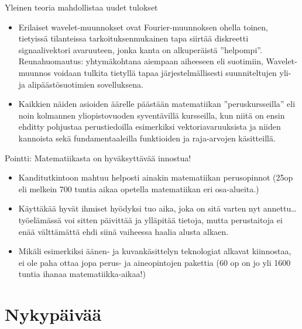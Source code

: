 \documentclass[pdf,handout,10pt]{beamer}
\begin{document}
\begin{frame}{Yleinen teoria mahdollistaa uudet tulokset}
\begin{itemize}
\item
  Erilaiset wavelet-muunnokset \cite{daubechies1990wavelet} ovat
  Fourier-muunnoksen ohella toinen, tietyissä tilanteissa
  tarkoituksenmukainen tapa siirtää diskreetti signaalivektori
  avaruuteen, jonka kanta on alkuperäistä
  ''helpompi''. Reunahuomautus: yhtymäkohtana aiempaan aiheeseen eli
  suotimiin, Wavelet-muunnos voidaan tulkita tietyllä tapaa
  järjestelmällisesti suunniteltujen yli- ja alipäästösuotimien
  sovelluksena.
\item
  Kaikkien näiden asioiden äärelle päästään matematiikan
  ''peruskursseilla'' eli noin kolmannen yliopistovuoden syventävillä
  kursseilla, kun niitä on ensin ehditty pohjustaa perustiedoilla
  esimerkiksi vektoriavaruuksista ja niiden kannoista sekä
  fundamentaaleilla funktioiden ja raja-arvojen käsitteillä.
\end{itemize}
\end{frame}

\begin{frame}{Pointti: Matematiikasta on hyväksyttävää innostua!}

\begin{itemize}
\item
  Kanditutkintoon mahtuu helposti ainakin matematiikan perusopinnot
  (25op eli melkein 700 tuntia aikaa opetella matematiikan eri
  osa-alueita.)
\item
  Käyttäkää hyvät ihmiset hyödyksi tuo aika, joka on sitä varten nyt
  annettu\ldots työelämässä voi sitten päivittää ja ylläpitää tietoja,
  mutta perustaitoja ei enää välttämättä ehdi siinä vaiheessa haalia
  alusta alkaen.
\item
  Mikäli esimerkiksi äänen- ja kuvankäsittelyn teknologiat alkavat
  kiinnostaa, ei ole paha ottaa jopa perus- ja aineopintojen
  pakettia (60 op on jo yli 1600 tuntia ihanaa matematiikka-aikaa!)
\end{itemize}
\end{frame}




\section{Nykypäivää}
\end{document}
